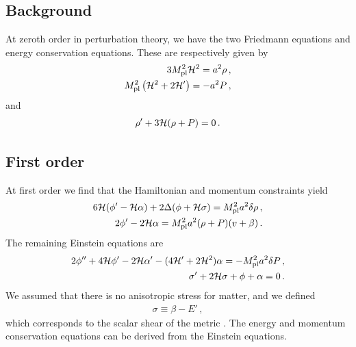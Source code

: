 \documentclass[a4paper,11pt]{article}
\numberwithin{equation}{section}
\begin{document}
\subsection{Background}
At zeroth order in perturbation theory, we have the two Friedmann equations and energy conservation equations. These are respectively given by
\begin{align}\label{eq:friedman}
3M_{\rm pl}^2{\cal H}^2=a^2\rho\,,\\
M_{\rm pl}^2\left({\cal H}^2+2{\cal H}'\right)=-a^2P\,,
\end{align}
and
\begin{align}
\rho'+3{\cal H}(\rho+P)=0\,.
\end{align}


\subsection{First order}
At first order we find that the Hamiltonian and momentum constraints yield \cite{Malik:2008im}
\begin{align}
6{\cal H}(\phi'-{\cal H}\alpha)+2\Delta(\phi+{\cal H}\sigma)=M_{\rm pl}^2a^2\delta\rho\,,\\
2\phi'-2{\cal H}\alpha=M_{\rm pl}^2a^2(\rho+P)(v+\beta)\,.
\end{align}
The remaining Einstein equations are
\begin{align}
2\phi''+4{\cal H}\phi'-2{\cal H}\alpha'-(4{\cal H}'+2{\cal H}^2)\alpha=-M_{\rm pl}^2a^2\delta P\,,\\
\sigma'+2{\cal H} \sigma+\phi+\alpha=0\,.
\end{align}
We assumed that there is no anisotropic stress for matter, and we defined
\begin{align}
\sigma\equiv\beta-E'\,,
\end{align}
which corresponds to the scalar shear of the metric \cite{Malik:2008im}. The energy and momentum conservation equations can be derived from the Einstein equations.
\end{document}
